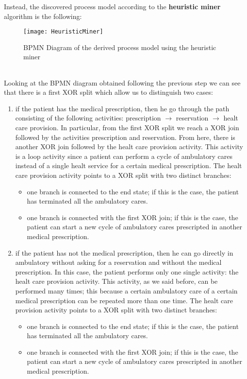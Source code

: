 \documentclass[paper=a4, fontsize=11pt]{scrartcl} %
\numberwithin{equation}{section} %
\numberwithin{figure}{section} %
\numberwithin{table}{section} %
\begin{document}
Instead, the discovered process model according to the \textbf{heuristic miner} algorithm is the following:
\begin{figure} [htbp]
\centering
\texttt{[image: HeuristicMiner]}
\caption{BPMN Diagram of the derived process model using the heuristic miner}
\end{figure}\\
Looking at the BPMN diagram obtained following the previous step we can see that there is a first XOR split which allow us to distinguish two cases:
\begin{enumerate}
\item if the patient has the medical prescription, then he go through the path consisting of the following activities: prescription $\rightarrow$ reservation $\rightarrow$ healt care provision. In particular, from the first XOR split we reach a XOR join followed by the activities prescription and reservation. From here, there is another XOR join followed by the healt care provision activity. This activity is a loop activity since a patient can perform a cycle of ambulatory cares instead of a single healt service for a certain medical prescription. The healt care provision activity points to a XOR split with two distinct branches:
\begin{itemize}
\item one branch is connected to the end state; if this is the case, the patient has terminated all the ambulatory cares. 
\item one branch is connected with the first XOR join; if this is the case, the patient can start a new cycle of ambulatory cares prescripted in another medical prescription.
\end{itemize} 
\item if the patient has not the medical prescription, then he can go directly in ambulatory without asking for a reservation and without the medical prescription. In this case, the patient performs only one single activity: the healt care provision activity. This activity, as we said before, can be performed many times; this because a certain ambulatory care of a certain medical prescription can be repeated more than one time.  The healt care provision activity points to a XOR split with two distinct branches:
\begin{itemize}
\item one branch is connected to the end state; if this is the case, the patient has terminated all the ambulatory cares. 
\item one branch is connected with the first XOR join; if this is the case, the patient can start a new cycle of ambulatory cares prescripted in another medical prescription.
\end{itemize} 
\end{enumerate}
\end{document}
